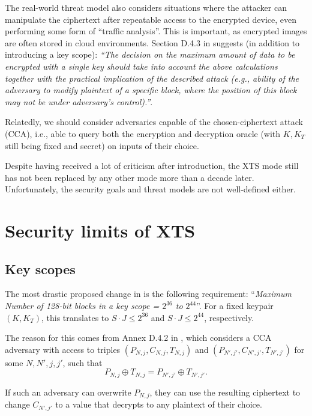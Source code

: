 \documentclass[a4paper]{article}
\begin{document}
The real-world threat model also considers situations where the attacker can manipulate the ciphertext after repeatable access to the encrypted device, even performing some form of ``traffic analysis''. This is important, as encrypted images are often stored in cloud environments.
Section D.4.3 in \cite{IEEE1619-draft} suggests (in addition to introducing a key scope): \emph{``The decision on the maximum amount of data to be encrypted with a single key should take into account the above calculations together with the practical implication of the described attack (e.g., ability of the adversary to modify plaintext of a specific block, where the position of this block may not be under adversary’s control).''}.

Relatedly, we should consider adversaries capable of the chosen-ciphertext attack (CCA), i.e., able to query both the encryption and decryption oracle (with $K, K_T$ still being fixed and secret) on inputs of their choice.

Despite having received a lot of criticism \cite{rogaway2011evaluation, ptacek2014xts} after introduction, the XTS mode still has not been replaced by any other mode more than a decade later. Unfortunately, the security goals and threat models are not well-defined either.

\section{Security limits of XTS}

\subsection{Key scopes}\label{key-scopes}
The most drastic proposed change in \cite{IEEE1619-draft} is the following requirement: ``\emph{Maximum Number of 128-bit blocks in a key scope = $2^{36}$ to $2^{44}$}''. For a fixed keypair $(K, K_T)$, this translates to $S\cdot J \le 2^{36}$ and $S\cdot J \le 2^{44}$, respectively.

The reason for this comes from Annex D.4.2 in \cite{IEEE1619-draft}, which considers a CCA adversary with access to triples $(P_{N,j}, C_{N,j}, T_{N,j})$ and $(P_{N',j'}, C_{N',j'}, T_{N',j'})$ for some $N, N', j, j'$, such that
\begin{equation}\label{collision}
    P_{N,j} \oplus T_{N,j} = P_{N',j'} \oplus T_{N',j'}.
\end{equation}

If such an adversary can overwrite $P_{N,j}$, they can use the resulting ciphertext to change $C_{N',j'}$ to a value that decrypts to any plaintext of their choice. 
\end{document}

